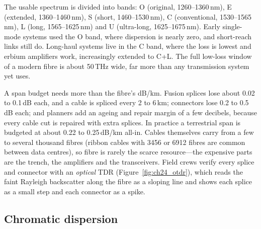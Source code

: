 
The usable spectrum is divided into bands: O (original, 1260--1360\,nm), E (extended, 1360--1460\,nm),
S (short, 1460--1530\,nm), C (conventional, 1530--1565\,nm), L (long, 1565--1625\,nm) and U (ultra-long,
1625--1675\,nm). Early single-mode systems used the O band, where dispersion is nearly zero, and short-reach
links still do. Long-haul systems live in the C band, where the loss is lowest and erbium amplifiers work,
increasingly extended to C+L. The full low-loss window of a modern fibre is about 50\,THz wide, far more
than any transmission system yet uses.

\begin{inpractice}
A span budget needs more than the fibre's dB/km. Fusion splices lose about 0.02 to 0.1\,dB each, and a
cable is spliced every 2 to 6\,km; connectors lose 0.2 to 0.5\,dB each; and planners add an ageing and
repair margin of a few decibels, because every cable cut is repaired with extra splices. In practice a
terrestrial span is budgeted at about 0.22 to 0.25\,dB/km all-in. Cables themselves carry from a few to
several thousand fibres (ribbon cables with 3456 or 6912 fibres are common between data centres), so fibre
is rarely the scarce resource---the expensive parts are the trench, the amplifiers and the transceivers.
Field crews verify every splice and connector with an \emph{optical} TDR (Figure~\ref{fig:ch24_otdr}),
which reads the faint Rayleigh backscatter along the fibre as a sloping line and shows each splice as a
small step and each connector as a spike.
\end{inpractice}


\subsection{Chromatic dispersion}

